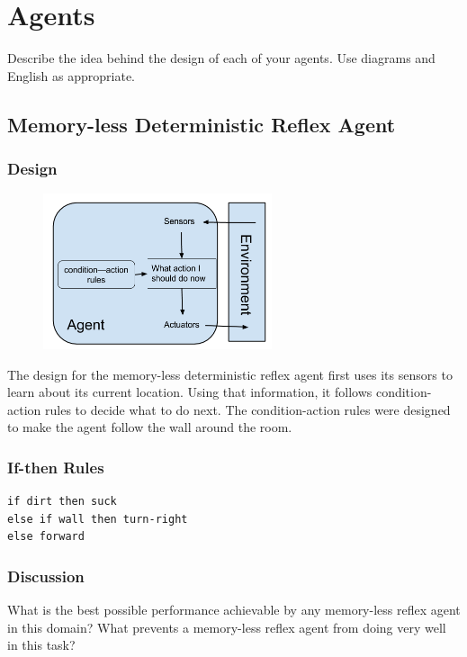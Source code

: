 \documentclass[a4paper,10pt]{article}
\begin{document}
\section{Agents}
Describe the idea behind the design of each of your agents. Use diagrams and English as appropriate.
\subsection{Memory-less Deterministic Reflex Agent}
\subsubsection{Design}
\begin{figure}[H]
	\begin{center}
		\includegraphics[width=0.6\textwidth]{MemorylessReflex.png}
	\end{center}
\end{figure}

The design for the memory-less deterministic reflex agent first uses its sensors to learn about its current location. Using that information, it follows condition-action rules to decide what to do next. The condition-action rules were designed to make the agent follow the wall around the room.

\subsubsection{If-then Rules}
\begin{verbatim}
if dirt then suck
else if wall then turn-right
else forward
\end{verbatim}

\subsubsection{Discussion}
What is the best possible performance achievable by any memory-less reflex agent in this domain? What prevents a memory-less reflex agent from doing very well in this task?
\end{document}
